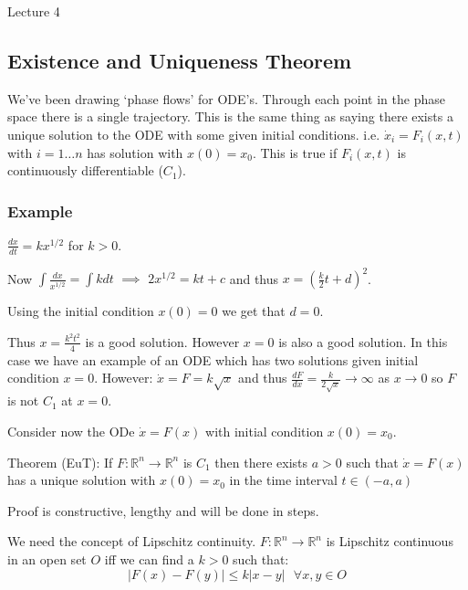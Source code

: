 \begin{center}

Lecture 4

\end{center}

\subsection{Existence and Uniqueness Theorem}

We've been drawing `phase flows' for ODE's. Through each point in the phase space there is a single trajectory. This is the same thing as saying there exists a unique solution to the ODE with some given initial conditions. i.e. $\dot{x}_i = F_i(x,t)$ with $i = 1 \ldots n$ has solution with $x(0) = x_0$. This is true if $F_i(x,t)$ is continuously differentiable ($C_1$).

\subsubsection{Example}

$\frac{dx}{dt} = k x^{1/2}$ for $k>0$.

Now $\int \frac{dx}{x^{1/2}} = \int k dt$ $\implies$ $2x^{1/2} = kt + c$ and thus $x = (\frac{k}{2} t + d)^2$.

Using the initial condition $x(0) = 0$ we get that $d=0$.

Thus $x = \frac{k^2 t^2}{4}$ is a good solution. However $x=0$ is also a good solution. In this case we have an example of an ODE which has two solutions given initial condition $x=0$. However: $\dot{x} = F = k \sqrt{x}$ and thus $\frac{dF}{dx} = \frac{k}{2 \sqrt{x}} \rightarrow \infty$ as $x \rightarrow 0$ so $F$ is not $C_1$ at $x=0$.

\vspace{\baselineskip}

Consider now the ODe $\dot{x} = F(x)$ with initial condition $x(0) = x_0$.

Theorem (EuT): If $F: \mathbb{R}^n \rightarrow \mathbb{R}^n$ is $C_1$ then there exists $a>0$ such that $\dot{x} = F(x)$ has a unique solution with $x(0) = x_0$ in the time interval $t \in (-a, a)$ 

\vspace{\baselineskip}

Proof is constructive, lengthy and will be done in steps.


We need the concept of Lipschitz continuity. $F:\mathbb{R}^n \rightarrow \mathbb{R}^n$ is Lipschitz continuous in an open set $O$ iff we can find a $k>0$ such that: $$|F(x) - F(y)| \leq k |x-y| \, \, \, \, \forall x,y \in O$$

